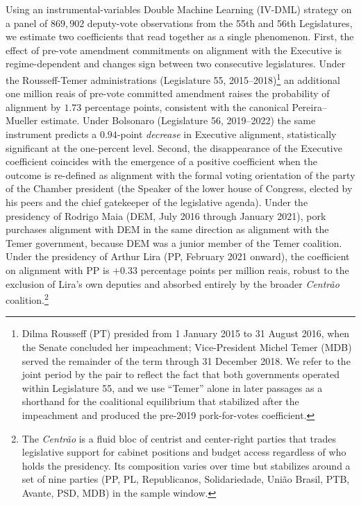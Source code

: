 \documentclass[preprint,12pt,authoryear]{elsarticle}
\begin{document}
Using an instrumental-variables Double Machine Learning (IV-DML) strategy on a panel of $869{,}902$ deputy-vote observations from the 55th and 56th Legislatures, we estimate two coefficients that read together as a single phenomenon. First, the effect of pre-vote amendment commitments on alignment with the Executive is regime-dependent and changes sign between two consecutive legislatures. Under the Rousseff-Temer administrations (Legislature 55, 2015--2018)\footnote{Dilma Rousseff (PT) presided from 1 January 2015 to 31 August 2016, when the Senate concluded her impeachment; Vice-President Michel Temer (MDB) served the remainder of the term through 31 December 2018. We refer to the joint period by the pair to reflect the fact that both governments operated within Legislature 55, and we use ``Temer'' alone in later passages as a shorthand for the coalitional equilibrium that stabilized after the impeachment and produced the pre-2019 pork-for-votes coefficient.} an additional one million reais of pre-vote committed amendment raises the probability of alignment by $1.73$ percentage points, consistent with the canonical Pereira--Mueller estimate. Under Bolsonaro (Legislature 56, 2019--2022) the same instrument predicts a $0.94$-point \emph{decrease} in Executive alignment, statistically significant at the one-percent level. Second, the disappearance of the Executive coefficient coincides with the emergence of a positive coefficient when the outcome is re-defined as alignment with the formal voting orientation of the party of the Chamber president (the Speaker of the lower house of Congress, elected by his peers and the chief gatekeeper of the legislative agenda). Under the presidency of Rodrigo Maia (DEM, July 2016 through January 2021), pork purchases alignment with DEM in the same direction as alignment with the Temer government, because DEM was a junior member of the Temer coalition. Under the presidency of Arthur Lira (PP, February 2021 onward), the coefficient on alignment with PP is $+0.33$ percentage points per million reais, robust to the exclusion of Lira's own deputies and absorbed entirely by the broader \emph{Centr\~ao} coalition.\footnote{The \emph{Centr\~ao} is a fluid bloc of centrist and center-right parties that trades legislative support for cabinet positions and budget access regardless of who holds the presidency. Its composition varies over time but stabilizes around a set of nine parties (PP, PL, Republicanos, Solidariedade, Uni\~ao Brasil, PTB, Avante, PSD, MDB) in the sample window.}
\end{document}
